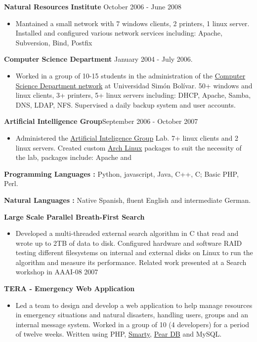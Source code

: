 \documentclass[10pt]{article}
\newcommand{\vitem}{\vspace*{-.4pc}\item}
\begin{document}
\noindent\textbf{Natural Resources Institute} \hfill October 2006 - June 2008
\begin{itemize}
\vitem Mantained a small network with 7 windows clients, 2 printers, 1
  linux server. Installed and configured various network services including:
  Apache, Subversion, Bind, Postfix
\end{itemize}

\noindent\textbf{Computer Science Department} \hfill January 2004 -
  July 2006.
\begin{itemize}
\vitem Worked in a group of 10-15 students in the administration of the
  \href{http://www.ldc.usb.ve}{Computer Science Department network}
  at Universidad Simón Bolívar. 50+ windows and linux clients, 3+
  printers, 5+ linux servers including: DHCP, Apache, Samba, DNS,
  LDAP, NFS. Supervised a daily backup system and user accounts.
\end{itemize}

\noindent\textbf{Artificial Intelligence Group}\hfill September 2006 - October 2007
\begin{itemize}
  \vitem Administered the \href{http://www.gia.usb.ve}{Artificial
    Inteligence Group} Lab. 7+ linux clients and 2 linux
  servers. Created custom \href{http://www.archlinux.org/}{Arch Linux}
  packages to suit the necessity of the lab, packages include: Apache
  and \LaTeXe{}
\end{itemize}

\flushleft\textbf{Programming Languages :} Python, javascript, Java,
C++, C; Basic PHP, Perl.

\noindent\textbf{Natural Languages :} Native Spanish, fluent English
and intermediate German.

\vspace{1pc}
\flushleft\textbf{Large Scale Parallel Breath-First Search}
\begin{itemize}
  \vitem Developed a multi-threaded external search algorithm in C
  that read and wrote up to 2TB of data to disk. Configured hardware and
  software RAID testing different filesystems on internal and external
  disks on Linux to run the algorithm and measure its
  performance. Related work presented at a Search workshop in AAAI-08
  \hfill 2007
\end{itemize}

\textbf{TERA - Emergency Web Application}
\begin{itemize}
\item Led a team to design and develop a web application to help
  manage resources in emergency situations and natural disasters,
  handling users, groups and an internal message system. Worked in a
  group of 10 (4 developers) for a period of twelve weeks. Written
  using PHP, \href{www.smarty.net/}{Smarty},
  \href{pear.php.net/package/DB}{Pear DB} and MySQL.
\end{itemize}
\end{document}
